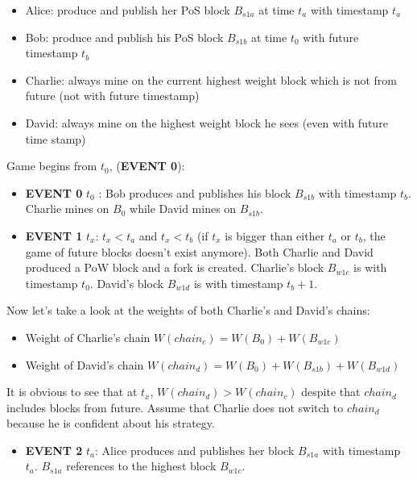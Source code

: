 \documentclass[a4paper]{article}
\begin{document}
\begin{appendices}
\begin{itemize}
    \item Alice: produce and publish her PoS block $B_{s1a}$ at time $t_a$ with timestamp $t_a$
    \item Bob: produce and publish his PoS block $B_{s1b}$ at time $t_0$ with future timestamp $t_b$
    \item Charlie: always mine on the current highest weight block which is not from future (not with future timestamp)
    \item David: always mine on the highest weight block he sees (even with future time stamp)
\end{itemize}

Game begins from $t_0$, (\textbf{EVENT 0}):

\begin{itemize}
    \item \textbf{EVENT 0} $t_0$ : Bob produces and publishes his block $B_{s1b}$ with timestamp $t_b$. Charlie mines on $B_0$ while David mines on $B_{s1b}$.
    \item \textbf{EVENT 1} $t_x$: $t_x < t_a$ and $t_x < t_b$ (if $t_x$ is bigger than either $t_a$ or $t_b$, the game of future blocks doesn't exist anymore). Both Charlie and David produced a PoW block and a fork is created. Charlie's block $B_{w1c}$ is with timestamp $t_0$. David's block $B_{w1d}$ is with timestamp $t_b + 1$.
\end{itemize}

Now let's take a look at the weights of both Charlie's and David's chains:

\begin{itemize}
    \item Weight of Charlie's chain $W(chain_c) = W(B_0) + W(B_{w1c})$
    \item Weight of David's chain $W(chain_d) = W(B_0) + W(B_{s1b}) + W(B_{w1d})$
\end{itemize}

It is obvious to see that at $t_x$, $W(chain_d) > W(chain_c)$ despite that $chain_d$ includes blocks from future. Assume that Charlie does not switch to $chain_d$ because he is confident about his strategy.

\begin{itemize}
    \item \textbf{EVENT 2} $t_a$: Alice produces and publishes her block $B_{s1a}$ with timestamp $t_a$. $B_{s1a}$ references to the highest block $B_{w1c}$.
\end{itemize}


\end{appendices}
\end{document}
